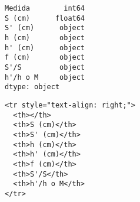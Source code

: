 \begin{Shaded}
\end{Shaded}

\begin{Shaded}
\begin{Highlighting}[]
\end{Highlighting}
\end{Shaded}

\begin{Shaded}
\begin{Highlighting}[]
\OperatorTok{=}\NormalTok{)}
\OperatorTok{=}
\end{Highlighting}
\end{Shaded}

\begin{Shaded}
\begin{Highlighting}[]
\end{Highlighting}
\end{Shaded}

\begin{verbatim}
Medida        int64
S (cm)      float64
S' (cm)      object
h (cm)       object
h' (cm)      object
f (cm)       object
S'/S         object
h'/h o M     object
dtype: object
\end{verbatim}

\begin{Shaded}
\begin{Highlighting}[]
\OperatorTok{=}\OperatorTok{=} \NormalTok{)}
\end{Highlighting}
\end{Shaded}

\begin{Shaded}
\begin{Highlighting}[]
\end{Highlighting}
\end{Shaded}

\begin{verbatim}
<tr style="text-align: right;">
  <th></th>
  <th>S (cm)</th>
  <th>S' (cm)</th>
  <th>h (cm)</th>
  <th>h' (cm)</th>
  <th>f (cm)</th>
  <th>S'/S</th>
  <th>h'/h o M</th>
</tr>
\end{verbatim}

